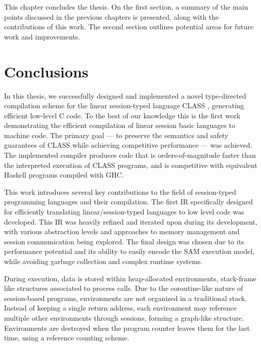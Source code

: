 \label{chap:conclusion}

This chapter concludes the thesis. On the first section, a summary of the main points discussed in the previous chapters is presented, along with the contributions of this work. The second section outlines potential areas for future work and improvements. 

\section{Conclusions}

In this thesis, we successfully designed and implemented a novel type-directed compilation scheme for the linear session-typed language \ac{CLASS} \cite{Rocha:2022, Rocha:2023,Rocha:2021}, generating efficient low-level C code. To the best of our knowledge this is the first work demonstrating the efficient compilation of linear session basic languages to machine code. The primary goal --- to preserve the semantics and safety guarantees of \ac{CLASS} while achieving competitive performance --- was achieved. The implemented compiler produces code that is orders-of-magnitude faster than the interpreted execution of \ac{CLASS} programs, and is competitive with equivalent Haskell programs compiled with GHC.

This work introduces several key contributions to the field of session-typed programming languages and their compilation. The first \acf{IR} specifically designed for efficiently translating linear/session-typed languages to low level code was developed. This \ac{IR} was heavily refined and iterated upon during its development, with various abstraction levels and approaches to memory management and session communication being explored. The final design was chosen due to its performance potential and its ability to easily encode the \ac{SAM} execution model, while avoiding garbage collection and complex runtime systems.

During execution, data is stored within heap-allocated environments, stack-frame like structures associated to process calls. Due to the coroutine-like nature of session-based programs, environments are not organized in a traditional stack. Instead of keeping a single return address, each environment may reference multiple other environments through sessions, forming a graph-like structure. Environments are destroyed when the program counter leaves them for the last time, using a reference counting scheme.

